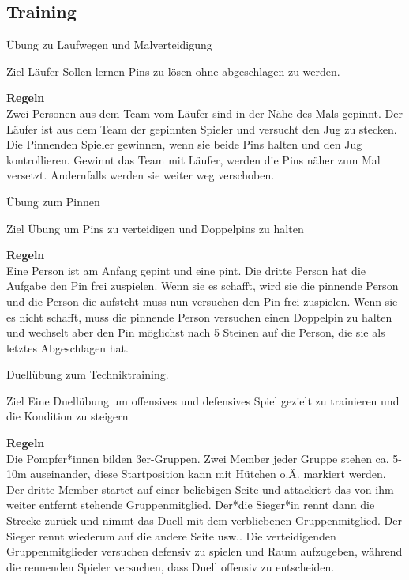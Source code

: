 \subsection*{\centering \LARGE Training}





Übung zu Laufwegen und Malverteidigung

\begin{bclogo}[logo=\bcoutil]{Ziel}
Läufer Sollen lernen Pins zu lösen ohne abgeschlagen zu werden.
\end{bclogo}

\textbf{\large Regeln}\\
Zwei Personen aus dem Team vom Läufer sind in der Nähe des Mals gepinnt. Der Läufer ist aus dem Team der gepinnten Spieler und versucht den Jug zu stecken. Die Pinnenden Spieler gewinnen, wenn sie beide Pins halten und den Jug kontrollieren. Gewinnt das Team mit Läufer, werden die Pins näher zum Mal versetzt. Andernfalls werden sie weiter weg verschoben.




Übung zum Pinnen

\begin{bclogo}[logo=\bcoutil]{Ziel}
Übung um Pins zu verteidigen und Doppelpins zu halten
\end{bclogo}

\textbf{\large Regeln}\\
Eine Person ist am Anfang gepint und eine pint. Die dritte Person hat die Aufgabe den Pin frei zuspielen. Wenn sie es schafft, wird sie die pinnende Person und die Person die aufsteht muss nun versuchen den Pin frei zuspielen. Wenn sie es nicht schafft, muss die pinnende Person versuchen einen Doppelpin zu halten und wechselt aber den Pin möglichst nach 5 Steinen auf die Person, die sie als letztes Abgeschlagen hat. 



Duellübung zum Techniktraining.

\begin{bclogo}[logo=\bcoutil]{Ziel}
Eine Duellübung um offensives und defensives Spiel gezielt zu trainieren und die Kondition zu steigern
\end{bclogo}

\textbf{\large Regeln}\\
Die Pompfer*innen bilden 3er-Gruppen. Zwei Member jeder Gruppe stehen ca. 5-10m auseinander, diese Startposition kann mit Hütchen o.Ä. markiert werden. Der dritte Member startet auf einer beliebigen Seite und attackiert das von ihm weiter entfernt stehende Gruppenmitglied. Der*die Sieger*in rennt dann die Strecke zurück und nimmt das Duell mit dem verbliebenen Gruppenmitglied. Der Sieger rennt wiederum auf die andere Seite usw.. Die verteidigenden Gruppenmitglieder versuchen defensiv zu spielen und Raum aufzugeben, während die rennenden Spieler versuchen, dass Duell offensiv zu entscheiden.




